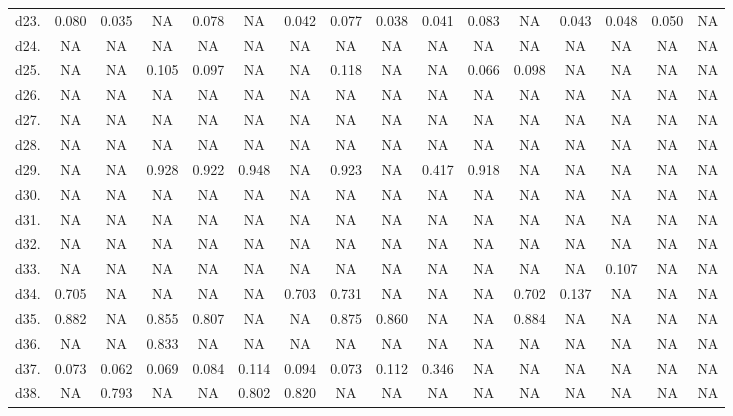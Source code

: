 \begin{table}
\begin{tabular}{lccccccccccccccc}
d23. & 0.080 & 0.035 & NA    & 0.078 & NA    & 0.042 & 0.077 & 0.038 & 0.041 & 0.083 & NA    & 0.043 & 0.048 & 0.050 & NA \\
d24. & NA    & NA    & NA    & NA    & NA    & NA    & NA    & NA    & NA    & NA    & NA    & NA    & NA    & NA    & NA \\
d25. & NA    & NA    & 0.105 & 0.097 & NA    & NA    & 0.118 & NA    & NA    & 0.066 & 0.098 & NA    & NA    & NA    & NA \\
d26. & NA    & NA    & NA    & NA    & NA    & NA    & NA    & NA    & NA    & NA    & NA    & NA    & NA    & NA    & NA \\
d27. & NA    & NA    & NA    & NA    & NA    & NA    & NA    & NA    & NA    & NA    & NA    & NA    & NA    & NA    & NA \\
d28. & NA    & NA    & NA    & NA    & NA    & NA    & NA    & NA    & NA    & NA    & NA    & NA    & NA    & NA    & NA \\
d29. & NA    & NA    & 0.928 & 0.922 & 0.948 & NA    & 0.923 & NA    & 0.417 & 0.918 & NA    & NA    & NA    & NA    & NA \\
d30. & NA    & NA    & NA    & NA    & NA    & NA    & NA    & NA    & NA    & NA    & NA    & NA    & NA    & NA    & NA \\
d31. & NA    & NA    & NA    & NA    & NA    & NA    & NA    & NA    & NA    & NA    & NA    & NA    & NA    & NA    & NA \\
d32. & NA    & NA    & NA    & NA    & NA    & NA    & NA    & NA    & NA    & NA    & NA    & NA    & NA    & NA    & NA \\
d33. & NA    & NA    & NA    & NA    & NA    & NA    & NA    & NA    & NA    & NA    & NA    & NA    & 0.107 & NA    & NA \\
d34. & 0.705 & NA    & NA    & NA    & NA    & 0.703 & 0.731 & NA    & NA    & NA    & 0.702 & 0.137 & NA    & NA    & NA \\
d35. & 0.882 & NA    & 0.855 & 0.807 & NA    & NA    & 0.875 & 0.860 & NA    & NA    & 0.884 & NA    & NA    & NA    & NA \\
d36. & NA    & NA    & 0.833 & NA    & NA    & NA    & NA    & NA    & NA    & NA    & NA    & NA    & NA    & NA    & NA \\
d37. & 0.073 & 0.062 & 0.069 & 0.084 & 0.114 & 0.094 & 0.073 & 0.112 & 0.346 & NA    & NA    & NA    & NA    & NA    & NA \\
d38. & NA    & 0.793 & NA    & NA    & 0.802 & 0.820 & NA    & NA    & NA    & NA    & NA    & NA    & NA    & NA    & NA \\

\end{tabular}
\end{table}
